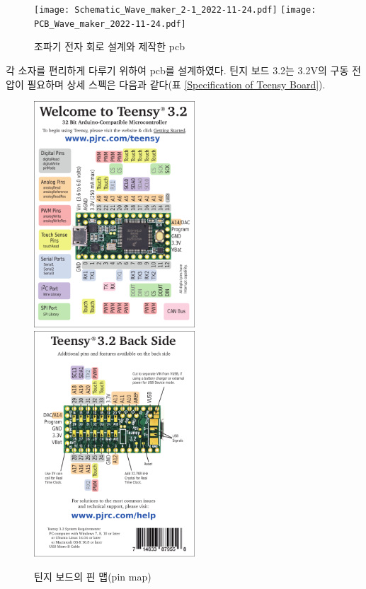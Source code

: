 \begin{figure}[H]
	\begin{center}
		\texttt{[image: Schematic\_Wave\_maker\_2-1\_2022-11-24.pdf]}
		\texttt{[image: PCB\_Wave\_maker\_2022-11-24.pdf]}
        \caption{조파기 전자 회로 설계와 제작한 pcb}
		\label{PCB}
	\end{center}
\end{figure}

각 소자를 편리하게 다루기 위하여 pcb를 설계하였다. 틴지 보드 3.2는 3.2$\mathrm{V}$의 구동 전압이 필요하며 상세 스펙은 다음과 같다(표 \ref{Specification of Teensy Board}).

\begin{figure}[H]
    \centering
    \includegraphics[width=6cm]{images/Teensy3.2 - 1.pdf}
    \includegraphics[width=6cm]{images/Teensy3.2 - 2.pdf}
    \caption{틴지 보드의 핀 맵(pin map)}
    \label{fig:enter-label}
\end{figure}

